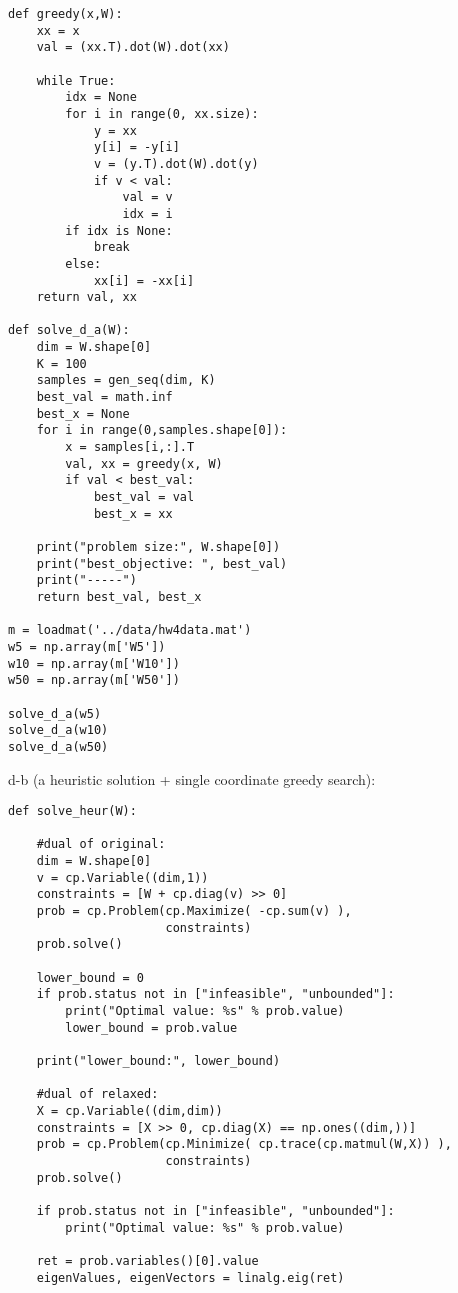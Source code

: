 \documentclass[12pt,letter]{article}
\begin{document}
\begin{enumerate}
\begin{enumerate}
\begin{itemize}
\begin{verbatim}
def greedy(x,W):
    xx = x
    val = (xx.T).dot(W).dot(xx)

    while True:
        idx = None
        for i in range(0, xx.size):
            y = xx
            y[i] = -y[i]
            v = (y.T).dot(W).dot(y)
            if v < val:
                val = v
                idx = i
        if idx is None:
            break
        else:
            xx[i] = -xx[i]
    return val, xx

def solve_d_a(W):
    dim = W.shape[0]
    K = 100
    samples = gen_seq(dim, K)
    best_val = math.inf
    best_x = None
    for i in range(0,samples.shape[0]):
        x = samples[i,:].T
        val, xx = greedy(x, W)
        if val < best_val:
            best_val = val
            best_x = xx
            
    print("problem size:", W.shape[0])
    print("best_objective: ", best_val)
    print("-----")
    return best_val, best_x
    
m = loadmat('../data/hw4data.mat')
w5 = np.array(m['W5'])
w10 = np.array(m['W10'])
w50 = np.array(m['W50'])

solve_d_a(w5)
solve_d_a(w10)
solve_d_a(w50)
\end{verbatim}

      \pagebreak
      
      d-b (a heuristic solution + single coordinate greedy search):

\begin{verbatim}
def solve_heur(W):
    
    #dual of original:
    dim = W.shape[0]
    v = cp.Variable((dim,1))
    constraints = [W + cp.diag(v) >> 0]
    prob = cp.Problem(cp.Maximize( -cp.sum(v) ),
                      constraints)
    prob.solve()
    
    lower_bound = 0
    if prob.status not in ["infeasible", "unbounded"]:
        print("Optimal value: %s" % prob.value)
        lower_bound = prob.value

    print("lower_bound:", lower_bound)

    #dual of relaxed:
    X = cp.Variable((dim,dim))
    constraints = [X >> 0, cp.diag(X) == np.ones((dim,))]
    prob = cp.Problem(cp.Minimize( cp.trace(cp.matmul(W,X)) ),
                      constraints)
    prob.solve()
    
    if prob.status not in ["infeasible", "unbounded"]:
        print("Optimal value: %s" % prob.value)

    ret = prob.variables()[0].value
    eigenValues, eigenVectors = linalg.eig(ret)


\end{verbatim}
\end{itemize}
\end{enumerate}
\end{enumerate}
\end{document}
